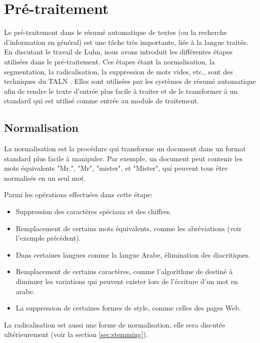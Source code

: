 \documentclass[a4paper,12pt,oneside]{../use/ESIthesis}
\begin{document}
\section{Pré-traitement}
\label{sec:pre-trait}

Le pré-traitement dans le résumé automatique de textes (ou la recherche d'information en général) est une tâche très importante, liée à la langue traitée. 
En discutant le travail de Luhn, nous avons introduit les différentes étapes utilisées dans le pré-traitement. 
Ces étapes étant la normalisation, la segmentation, la radicalisation, la suppression de mots vides, etc., sont des techniques du TALN \cite{04-brants}. 
Elles sont utilisées par les systèmes de résumé automatique afin de rendre le texte d'entrée plus facile à traiter et de le transformer à un standard qui est utilisé comme entrée au module de traitement. 

\subsection{Normalisation}

La normalisation est la procédure qui transforme un document dans un format standard plus facile à manipuler. 
Par exemple, un document peut contenir les mots équivalents "Mr.", "Mr", "mister", et "Mister", qui peuvent tous être normalisés en un seul mot. 

Parmi les opérations effectuées dans cette étape:
\begin{itemize}
\item Suppression des caractères spéciaux et des chiffres. 
\item Remplacement de certains mots équivalents, comme les abréviations (voir l'exemple précédent). 
\item Dans certaines langues comme la langue Arabe, élimination des diacritiques. 
\item Remplacement de certains caractères, comme l'algorithme de \cite{02-larkey-al} destiné à diminuer les variations qui peuvent exister lors de l'écriture d'un mot en arabe. 
\item La suppression de certaines formes de style, comme celles des pages Web. 
\end{itemize}
La radicalisation est aussi une forme de normalisation, elle sera discutée ultérieurement (voir la section \ref{sec:stemming}).
\end{document}
